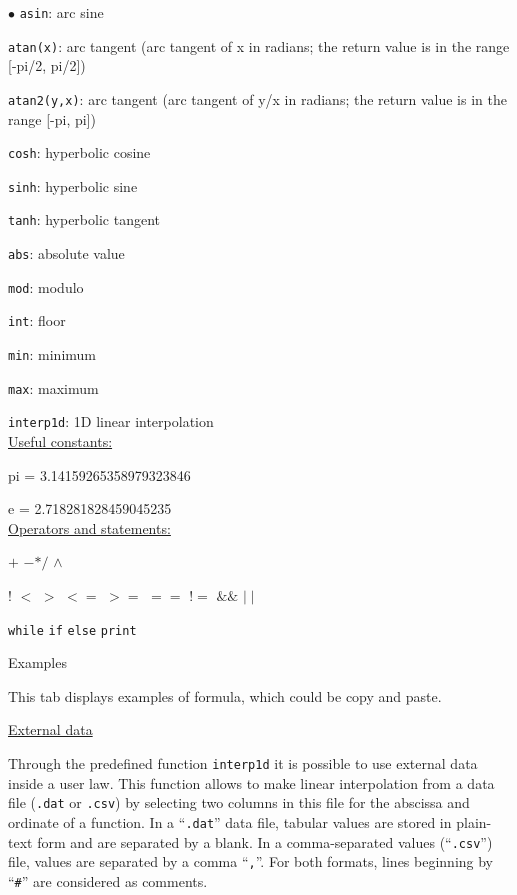 {{{\begin{list}{$\bullet$}{}
\texttt{asin}: arc sine

\texttt{atan(x)}: arc tangent (arc tangent of x in radians; the return value is in the range [-pi/2, pi/2])

\texttt{atan2(y,x)}: arc tangent (arc tangent of y/x in radians; the return value is in the range [-pi, pi])

\texttt{cosh}: hyperbolic cosine

\texttt{sinh}: hyperbolic sine

\texttt{tanh}: hyperbolic tangent

\texttt{abs}: absolute value

\texttt{mod}: modulo

\texttt{int}: floor

\texttt{min}: minimum

\texttt{max}: maximum

\texttt{interp1d}: 1D linear interpolation\\


\underline{Useful constants:}

pi = 3.14159265358979323846

e = 2.718281828459045235\\


\underline{Operators and statements:}

$+$ \qquad$-$\qquad $*$\qquad $/$ \qquad$\wedge$

! \qquad $<$ \qquad $>$ \qquad $<=$ \qquad $>=$ \qquad $==$ \qquad $!=$ \qquad $\&\&$ \qquad $\mid\mid$

\texttt{while} \texttt{if} \texttt{else} \texttt{print}


\item Examples

This tab displays examples of formula, which could be copy and paste.

\end{list}

\underline{External data}

Through the predefined function \texttt{interp1d} it is possible to use
external data inside a user law. This function allows to make linear interpolation
from a data file (\texttt{.dat} or \texttt{.csv}) by selecting two columns in this file
for the abscissa and ordinate of a function. In a ``\texttt{.dat}'' data file, tabular
values are stored in plain-text form and are separated by a blank. In a comma-separated values
(``\texttt{.csv}'') file, values are separated by a comma ``\texttt{,}''.
For both formats, lines beginning by ``\texttt{\#}'' are considered as comments.

}}}
